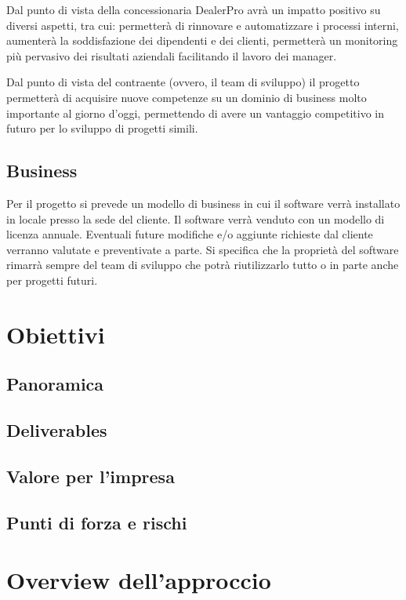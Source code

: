 \documentclass{article}
\begin{document}
  Dal punto di vista della concessionaria DealerPro avrà un impatto positivo su 
    diversi aspetti, tra cui: permetterà di rinnovare e automatizzare i processi
    interni, aumenterà la soddisfazione dei dipendenti e dei clienti, 
    permetterà un monitoring più pervasivo dei risultati aziendali facilitando il 
    lavoro dei manager.

  Dal punto di vista del contraente (ovvero, il team di sviluppo) il progetto 
    permetterà di acquisire nuove competenze su un dominio di business molto importante
    al giorno d'oggi, permettendo di avere un vantaggio competitivo in futuro per lo 
    sviluppo di progetti simili.

  \subsection{Business}
  
  Per il progetto si prevede un modello di business in cui il software verrà installato in locale
    presso la sede del cliente. Il software verrà venduto con un modello di licenza annuale.
    Eventuali future modifiche e/o aggiunte richieste dal cliente verranno valutate e preventivate a parte.
    Si specifica che la proprietà del software rimarrà sempre del team di sviluppo che potrà riutilizzarlo tutto 
    o in parte anche per progetti futuri.



  \newpage
  \section{Obiettivi}

  \subsection{Panoramica}
  \subsection{Deliverables}
  \subsection{Valore per l'impresa}
  \subsection{Punti di forza e rischi}


  \newpage
  \section{Overview dell'approccio}
\end{document}
